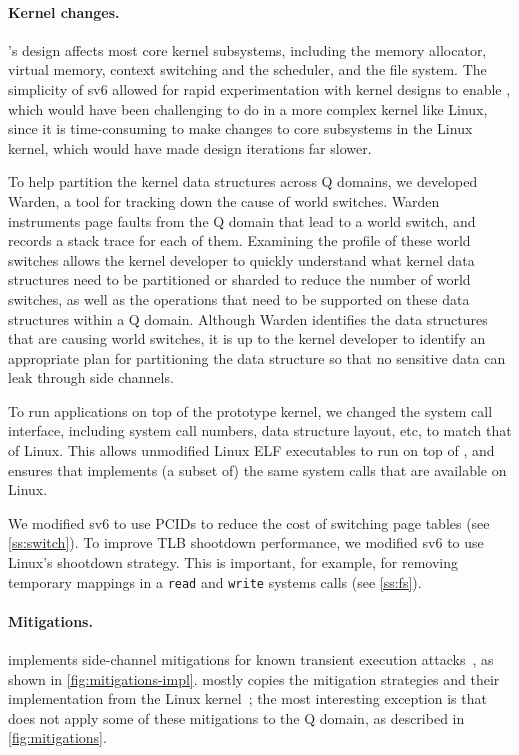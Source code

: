 \paragraph{Kernel changes.}

\sys's design affects most core kernel subsystems, including the memory
allocator, virtual memory, context switching and the scheduler, and the
file system.  The simplicity of sv6 allowed for rapid experimentation
with kernel designs to enable \sys, which would have been challenging
to do in a more complex kernel like Linux, since it is time-consuming
to make changes to core subsystems in the Linux kernel, which would have made
design iterations far slower.

To help partition the kernel data structures across Q domains, we
developed Warden, a tool for tracking down the cause of world switches.
Warden instruments page faults from the Q domain that lead to a
world switch, and records a stack trace for each of them.  Examining the
profile of these world switches allows the kernel developer to quickly
understand what kernel data structures need to be partitioned or sharded
to reduce the number of world switches, as well as the operations
that need to be supported on these data structures within a Q domain.
Although Warden identifies the data structures that are causing world
switches, it is up to the kernel developer to identify an appropriate
plan for partitioning the data structure so that no sensitive data can
leak through side channels.

To run applications on top of the \sys prototype kernel, we changed the
\sys system call interface, including system call numbers, data structure
layout, etc, to match that of Linux.  This allows unmodified Linux
ELF executables to run on top of \sys, and ensures that \sys implements
(a subset of) the same system calls that are available on Linux.

We modified sv6 to use PCIDs to reduce the cost of switching page
tables (see \autoref{ss:switch}).  To improve TLB shootdown
performance, we modified sv6 to use Linux's shootdown strategy.  This
is important, for example, for removing temporary mappings in a
\texttt{read} and \texttt{write} systems calls (see \autoref{ss:fs}).

\paragraph{Mitigations.}

\sys implements side-channel mitigations for known transient
execution attacks~\cite{hill:survey,sok:transient}, as shown
in \autoref{fig:mitigations-impl}.  \sys mostly copies the
mitigation strategies and their implementation from the Linux
kernel~\cite{linux:vuln}; the most interesting exception is that \sys
does not apply some of these mitigations to the Q domain, as described
in \autoref{fig:mitigations}.

